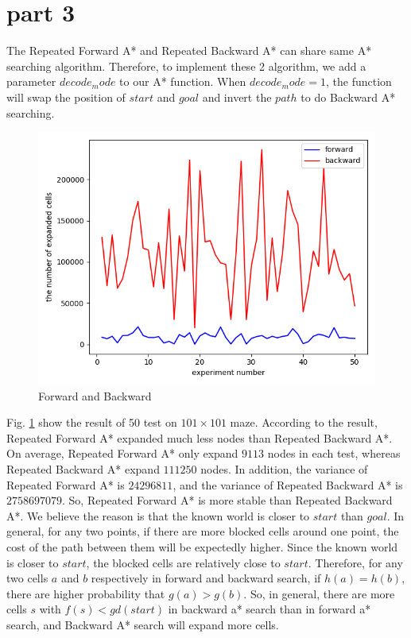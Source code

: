 \documentclass[11pt]{article}
\begin{document}
\section*{part 3}
The Repeated Forward A* and Repeated Backward A* can share same A* searching algorithm. Therefore, to implement these 2 algorithm, we add a parameter $decode_mode$ to our A* function. When $decode_mode = 1$, the function will swap the position of $start$ and $goal$ and invert the $path$ to do Backward A* searching.
	\begin{figure}[htb]
		\centering
		\includegraphics[scale = 0.3]{forward_backward.png}
		\caption{Forward and Backward}
		\label{fig:Fig3.F&B}
	\end{figure}
\newline
Fig. \ref{fig:Fig3.F&B} show the result of 50 test on $101\times 101$ maze. According to the  result, Repeated Forward A* expanded much less  nodes than Repeated Backward A*. On average, Repeated Forward A* only expand $9113$ nodes in each test, whereas Repeated Backward A* expand $111250$ nodes. In addition, the variance of Repeated Forward A* is $24296811$, and the variance of Repeated Backward A* is $2758697079$. So, Repeated Forward A* is more stable than Repeated Backward A*.
\newline
We believe the reason is that the known world is closer to $start$ than $goal$. In general, for any two points, if there are more blocked cells around one point, the cost of the path between them will be expectedly higher. Since the known world is closer to $start$, the blocked cells are relatively close to $start$. Therefore, for any two cells $a$ and $b$ respectively in forward and backward search, if $h(a) = h(b)$, there are higher probability that $g(a) > g(b)$. So, in general, there are more cells $s$ with $f(s) < gd(start)$ in backward a* search than in forward a* search, and Backward A* search will expand more cells.
\end{document}
